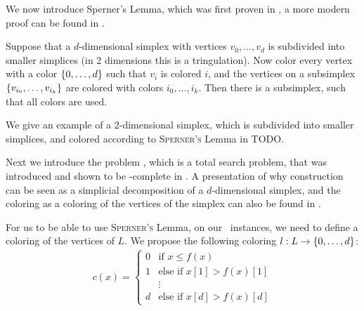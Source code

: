 We now introduce Sperner's Lemma, which was first proven in , a more modern proof can be found in .
\begin{theorem}
    Suppose that a $d$-dimensional simplex with vertices $v_0, \dots, v_d$ is subdivided into smaller simplices (in 2 dimensions this is a tringulation). Now color every vertex with a color $\left\{0, \dots, d\right\}$ such that $v_i$ is colored $i$, and the vertices on a subsimplex $\left\{v_{i_0}, \dots, v_{i_k}\right\}$ are colored with colors $i_0, \dots, i_k$. Then there is a subsimplex, such that all colors are used.
\end{theorem}

We give an example of a 2-dimensional simplex, which is subdivided into smaller simplices, and colored according to \textsc{Sperner's} Lemma in TODO.

Next we introduce the problem \Sperner, which is a total search problem, that was introduced and shown to be \PPAD-complete in .
A presentation of why construction can be seen as a simplicial decomposition of a $d$-dimensional simplex, and the coloring as a coloring of the vertices of the simplex can also be found in \cite{papadimitriou_complexity_1994-1}.

For us to be able to use \textsc{Sperner's} Lemma, on our \Tarskistar\ instances, we need to define a coloring of the vertices of $L$. We propose the following coloring $l : L \rightarrow \left\{0, \dots, d\right\}$:
\begin{align*}
    c(x) =
    \begin{cases}
        0 & \text{if $x \leq f(x)$}         \\
        1 & \text{else if $x[1] > f(x)[1]$} \\
          & \vdots                          \\
        d & \text{else if $x[d] > f(x)[d]$}
    \end{cases}
\end{align*}

